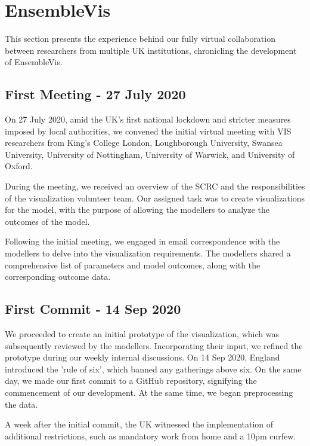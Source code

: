\section{EnsembleVis}
\label{sec:EnsembleVis}

This section presents the experience behind our fully virtual collaboration between researchers from multiple UK institutions, chronicling the development of EnsembleVis.

\subsection{First Meeting - 27 July 2020}
\label{subsec:InitialMeeting}
On 27 July 2020, amid the UK's first national lockdown and stricter measures imposed by local authorities, we convened the initial virtual meeting with VIS researchers from King's College London, Loughborough University, Swansea University, University of Nottingham, University of Warwick, and University of Oxford.

During the meeting, we received an overview of the SCRC and the responsibilities of the visualization volunteer team.
Our assigned task was to create visualizations for the model, with the purpose of allowing the modellers to analyze the outcomes of the model.

Following the initial meeting, we engaged in email correspondence with the modellers to delve into the visualization requirements. The modellers shared a comprehensive list of parameters and model outcomes, along with the corresponding outcome data.
\subsection{First Commit - 14 Sep 2020}
We proceeded to create an initial prototype of the visualization, which was subsequently reviewed by the modellers.
Incorporating their input, we refined the prototype during our weekly internal discussions.
On 14 Sep 2020, England introduced the 'rule of six', which banned any gatherings above six.
On the same day, we made our first commit to a GitHub repository, signifying the commencement of our development.
At the same time, we began preprocessing the data.

A week after the initial commit, the UK witnessed the implementation of additional restrictions, such as mandatory work from home and a 10pm curfew.

